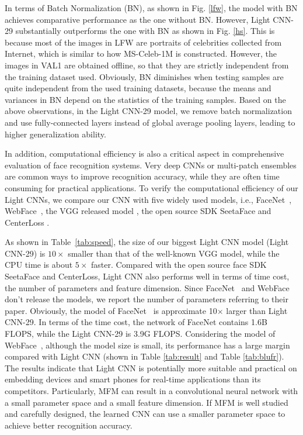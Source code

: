 \documentclass[journal,transmag]{IEEEtran}
\begin{document}
In terms of Batch Normalization (BN), as shown in Fig. \ref{lfw}, the model with BN achieves comparative performance as the one without BN. However, Light CNN-29 substantially outperforms the one with BN as shown in Fig. \ref{hs}. This is because most of the images in LFW are portraits of celebrities collected from Internet, which is similar to how MS-Celeb-1M is constructed. However, the images in VAL1 are obtained offline, so that they are strictly independent from the training dataset used.
Obviously, BN diminishes when testing samples are quite independent from the used training datasets, because the means and variances in BN depend on the statistics of the training samples. Based on the above observations, in the Light CNN-29 model, we remove batch normalization and use fully-connected layers instead of global average pooling layers, leading to higher generalization ability.

In addition, computational efficiency is also a critical aspect in comprehensive evaluation of face recognition systems. Very deep CNNs or multi-patch ensembles are common ways to improve recognition accuracy, while they are often time consuming for practical applications.
To verify the computational efficiency of our Light CNNs, we compare our CNN with five widely used models, i.e., FaceNet~\cite{schroff2015facenet}, WebFace~\cite{yi2014learning}, the VGG released model \cite{parkhi2015deep}, the open source SDK SeetaFace \cite{liu2016viplfacenet} and CenterLoss \cite{wen2016discriminative}.


As shown in Table~\ref{tab:speed}, the size of our biggest Light CNN model (Light CNN-29) is $10\times$ smaller than that of the well-known VGG model, while the CPU time is about $5\times$ faster. Compared with the open source face SDK SeetaFace and CenterLoss, Light CNN also performs well in terms of time cost, the number of parameters and feature dimension. Since FaceNet~\cite{schroff2015facenet} and WebFace~\cite{yi2014learning} don't release the models, we report the number of parameters referring to their paper. Obviously, the model of FaceNet~\cite{schroff2015facenet} is approximate 10$\times$ larger than Light CNN-29. In terms of the time cost, the network of FaceNet contains 1.6B FLOPS, while the Light CNN-29 is 3.9G FLOPS. Considering the model of WebFace~\cite{yi2014learning}, although the model size is small, its performance has a large margin compared with Light CNN (shown in Table \ref{tab:result} and Table \ref{tab:blufr}). The results indicate that Light CNN is potentially more suitable and practical on embedding devices and smart phones for real-time applications than its competitors. Particularly, MFM can result in a convolutional neural network with a small parameter space and a small feature dimension. If MFM is well studied and carefully designed, the learned CNN can use a smaller parameter space to achieve better recognition accuracy.
\end{document}

